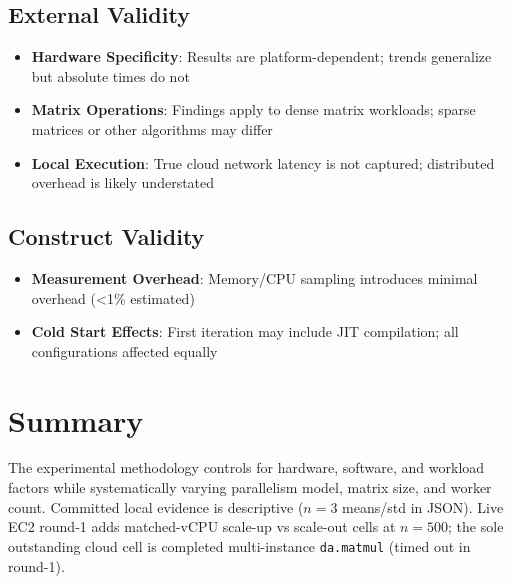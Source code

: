 \subsection{External Validity}

\begin{itemize}
    \item \textbf{Hardware Specificity}: Results are platform-dependent; trends generalize but absolute times do not
    \item \textbf{Matrix Operations}: Findings apply to dense matrix workloads; sparse matrices or other algorithms may differ
    \item \textbf{Local Execution}: True cloud network latency is not captured; distributed overhead is likely understated
\end{itemize}

\subsection{Construct Validity}

\begin{itemize}
    \item \textbf{Measurement Overhead}: Memory/CPU sampling introduces minimal overhead (<1\% estimated)
    \item \textbf{Cold Start Effects}: First iteration may include JIT compilation; all configurations affected equally
\end{itemize}

\section{Summary}

The experimental methodology controls for hardware, software, and workload factors while systematically varying parallelism model, matrix size, and worker count. Committed local evidence is descriptive ($n{=}3$ means/std in JSON). Live EC2 round-1 adds matched-vCPU scale-up vs scale-out cells at $n{=}500$; the sole outstanding cloud cell is completed multi-instance \texttt{da.matmul} (timed out in round-1).
